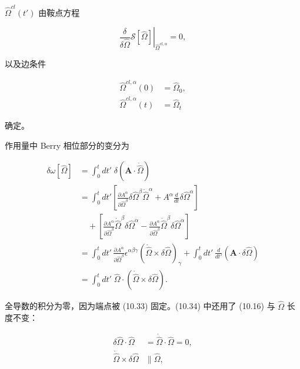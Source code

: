$\hat{\Omega}^{cl}(t')$ 由鞍点方程

\begin{equation*}
\left. \frac {\delta}{\delta \hat {\Omega}} \mathcal {S} [ \hat {\Omega} ] \right| _ {\hat {\Omega} ^ {cl, \alpha}} = 0 ,
\tag{10.32}
\end{equation*}

以及边条件

\begin{align*}
\hat {\Omega} ^ {cl, \alpha} ( 0 ) & = \hat {\Omega} _ {0} ,\\
\hat {\Omega} ^ {cl, \alpha} ( t ) & = \hat {\Omega} _ {t}
\tag{10.33}
\end{align*}

确定。

作用量中 Berry 相位部分的变分为

\begin{align*}
\delta \omega [ \hat {\Omega} ] & = \int_ {0} ^ {t} d t ' \; \delta \left( \mathbf {A} \cdot \dot {\hat {\Omega}} \right)\\
& = \int_ {0} ^ {t} d t ' \left[ \frac {\partial A ^ {\alpha}}{\partial \hat {\Omega} ^ {\beta}} \delta \hat {\Omega} ^ {\beta} \dot {\hat {\Omega}} ^ {\alpha} + A ^ {\alpha} \frac {d}{d t} \delta \hat {\Omega} ^ {\alpha} \right]\\
& \quad + \left[ \frac {\partial A ^ {\alpha}}{\partial \hat {\Omega} ^ {\beta}} \dot {\hat {\Omega}} ^ {\beta} \delta \hat {\Omega} ^ {\alpha} - \frac {\partial A ^ {\alpha}}{\partial \hat {\Omega} ^ {\beta}} \dot {\hat {\Omega}} ^ {\beta} \delta \hat {\Omega} ^ {\alpha} \right]\\
& = \int_ {0} ^ {t} d t ' \, \frac {\partial A ^ {\alpha}}{\partial \hat {\Omega} ^ {\beta}} \epsilon^ {\alpha \beta \gamma} ( \dot {\hat {\Omega}} \times \delta \hat {\Omega} ) _ {\gamma} + \int_ {0} ^ {t} d t ' \, \frac {d}{d t '} \left( \mathbf {A} \cdot \delta \hat {\Omega} \right)\\
& = \int_ {0} ^ {t} d t ' \; \hat {\Omega} \cdot ( \dot {\hat {\Omega}} \times \delta \hat {\Omega} ) .
\tag{10.34}
\end{align*}

全导数的积分为零，因为端点被 (10.33) 固定。(10.34) 中还用了 (10.16) 与 $\hat{\Omega}$ 长度不变：

\begin{align*}
\delta \hat {\Omega} \cdot \hat {\Omega} & = \dot {\hat {\Omega}} \cdot \hat {\Omega} = 0 ,\\
\dot {\hat {\Omega}} \times \delta \hat {\Omega} & \parallel \hat {\Omega} ,
\tag{10.35}
\end{align*}

